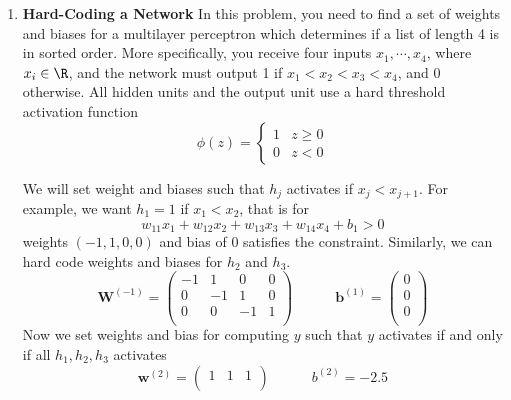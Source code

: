 \documentclass[11pt]{article}
\begin{document}
\newcommand{\calE}{\mathcal{E}}
\newcommand{\calR}{\mathcal{R}}
\newcommand{\calS}{\mathcal{S}}
\newcommand{\calL}{\mathcal{L}}
\newcommand{\lebpar}[2]{\frac{\partial #1}{\partial #2}}

\begin{enumerate}
\item \textbf{Hard-Coding a Network} In this problem, you need to find a set of weights and biases for a multilayer perceptron which determines if a list of length 4 is in sorted order. More specifically, you receive four inputs $x_1,\cdots,x_4$, where $x_i\in \R$, and the network must output 1 if $x_1 < x_2 < x_3 < x_4$, and 0 otherwise. All hidden units and the output unit use a hard threshold activation function
\[
    \phi(z) = 
    \begin{cases}
        1 & z \geq 0 \\ 
        0 & z < 0
    \end{cases}    
\]
\begin{solution}
    We will set weight and biases such that $h_j$ activates if $x_j < x_{j+1}$. For example, we want $h_1 = 1$ if $x_1 < x_2$, that is for
    \[
        w_{11} x_1 + w_{12} x_2 + w_{13} x_3 + w_{14} x_4 + b_1> 0
    \]
    weights $(-1, 1, 0, 0)$ and bias of $0$ satisfies the constraint. Similarly, we can hard code weights and biases for $h_2$ and $h_3$. 
    \[
        \mathbf{W}^{(-1)} = 
        \begin{pmatrix}
            -1 & 1 & 0 & 0 \\
            0 & -1 & 1 & 0 \\
            0 & 0 & -1 & 1 \\ 
        \end{pmatrix}
        \quad \quad \quad 
        \mathbf{b}^{(1)} = 
        \begin{pmatrix}
            0 \\ 0 \\ 0 \\
        \end{pmatrix}
    \]
    Now we set weights and bias for computing $y$ such that $y$ activates if and only if all $h_1,h_2,h_3$ activates 
    \[
        \mathbf{w}^{(2)} = 
        \begin{pmatrix}
            1 & 1 & 1 \\ 
        \end{pmatrix}
        \quad \quad \quad 
        b^{(2)} = -2.5
    \]

\end{solution}


\end{enumerate}
\end{document}
